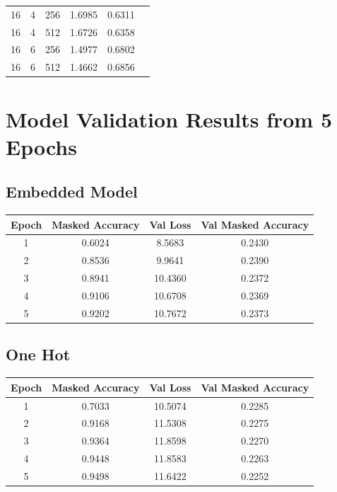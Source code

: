 \documentclass[12pt]{article} \usepackage{COSC420style} \usepackage{soul}
\begin{document}
\begin{table}[htbp]
\begin{tabular}{cccccc}
		16                       & 4                           & 256          & 1.6985        & 0.6311                   \\
		16                       & 4                           & 512          & 1.6726        & 0.6358                   \\
		16                       & 6                           & 256          & 1.4977        & 0.6802                   \\
		16                       & 6                           & 512          & 1.4662        & 0.6856                   \\
		\bottomrule
	\end{tabular}
\end{table}

\section*{Model Validation Results from 5 Epochs}

\label{sec:5_epoch_val}
\subsection*{Embedded Model}
\begin{tabular}{cccc}
	\toprule
	Epoch & Masked Accuracy & Val Loss & Val Masked Accuracy \\
	\midrule
	1     & 0.6024          & 8.5683   & 0.2430              \\
	2     & 0.8536          & 9.9641   & 0.2390              \\
	3     & 0.8941          & 10.4360  & 0.2372              \\
	4     & 0.9106          & 10.6708  & 0.2369              \\
	5     & 0.9202          & 10.7672  & 0.2373              \\
	\bottomrule
\end{tabular}

\subsection*{One Hot}
\begin{tabular}{cccc}
	\toprule
	Epoch & Masked Accuracy & Val Loss & Val Masked Accuracy \\
	\midrule
	1     & 0.7033          & 10.5074  & 0.2285              \\
	2     & 0.9168          & 11.5308  & 0.2275              \\
	3     & 0.9364          & 11.8598  & 0.2270              \\
	4     & 0.9448          & 11.8583  & 0.2263              \\
	5     & 0.9498          & 11.6422  & 0.2252              \\
	\bottomrule
\end{tabular}
\end{document}
